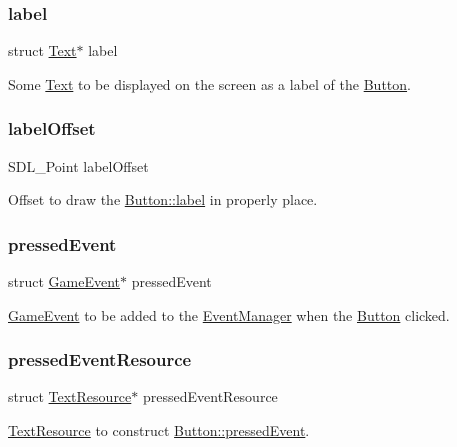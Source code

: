 \subsubsection{\texorpdfstring{label}{label}}
{\footnotesize\ttfamily struct \hyperlink{struct_text}{Text}$\ast$ label}

Some \hyperlink{struct_text}{Text} to be displayed on the screen as a label of the \hyperlink{struct_button}{Button}. \hypertarget{struct_button_ac8658f1193098d53c4bd1bdcab7df6af}{}\label{struct_button_ac8658f1193098d53c4bd1bdcab7df6af} 
\subsubsection{\texorpdfstring{label\+Offset}{labelOffset}}
{\footnotesize\ttfamily S\+D\+L\+\_\+\+Point label\+Offset}

Offset to draw the \hyperlink{struct_button_ab278201aa1758916bc9e825b3833e31b}{Button\+::label} in properly place. \hypertarget{struct_button_a6c6350ebecb76824f44acd4af5310894}{}\label{struct_button_a6c6350ebecb76824f44acd4af5310894} 
\subsubsection{\texorpdfstring{pressed\+Event}{pressedEvent}}
{\footnotesize\ttfamily struct \hyperlink{struct_game_event}{Game\+Event}$\ast$ pressed\+Event}

\hyperlink{struct_game_event}{Game\+Event} to be added to the \hyperlink{struct_event_manager}{Event\+Manager} when the \hyperlink{struct_button}{Button} clicked. \hypertarget{struct_button_a4f009b181e2d1679d58eeb638c79f1f7}{}\label{struct_button_a4f009b181e2d1679d58eeb638c79f1f7} 
\subsubsection{\texorpdfstring{pressed\+Event\+Resource}{pressedEventResource}}
{\footnotesize\ttfamily struct \hyperlink{struct_text_resource}{Text\+Resource}$\ast$ pressed\+Event\+Resource}

\hyperlink{struct_text_resource}{Text\+Resource} to construct \hyperlink{struct_button_a6c6350ebecb76824f44acd4af5310894}{Button\+::pressed\+Event}. \hypertarget{struct_button_a9d6a7ab6b4708d54a3e7da0a665609b2}{}\label{struct_button_a9d6a7ab6b4708d54a3e7da0a665609b2} 
